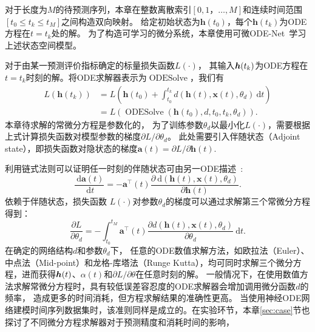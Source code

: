 对于长度为$M$的待预测序列，本章在整数离散索引$[0,1，\dots,M]$和连续时间范围$[t_0\leq t_k \leq t_{M}]$之间构造双向映射。
给定初始状态为$\boldsymbol{h}(t_0)$，每个$\boldsymbol{h}(t_k)$为ODE方程在$t=t_k$处的解。
为了构造可学习的微分系统，本章使用可微ODE-Net~\cite{NIPS2018_7892}学习上述状态空间模型。

对于由某一预测评价指标确定的标量损失函数$L(\cdot)$，
其输入$\boldsymbol{h}(t_k)$为ODE方程在$t=t_k$时刻的解。将ODE求解器表示为$\operatorname{ODESolve}$，我们有
\begin{align}
\label{equ:loss_ode_solver}
L\left(\boldsymbol{h}\left(t_{k}\right)\right)&=L\left(\boldsymbol{h}\left(t_{0}\right)+\int_{t_{0}}^{t_{k}} d(\boldsymbol{h}(t), \boldsymbol x(t), \theta_d) \mathrm{~d} t\right)\nonumber\\
&=L\left(\operatorname{ODESolve}\left(\boldsymbol{h}\left(t_{0}\right), d, t_{0}, t_{k}, \theta_d \right)\right).
\end{align}
本章待求解的常微分方程是参数化的，
为了训练参数$\theta _d$以最小化$L(\cdot)$，需要根据上式计算损失函数对模型参数的梯度$\partial L / \partial \theta _d$。
此处需要引入伴随状态（Adjoint state），即损失函数对隐状态的梯度$\boldsymbol{a}(t)=\partial L / \partial \boldsymbol{h}(t)$.

利用链式法则可以证明任一时刻的伴随状态可由另一ODE描述~\cite{NIPS2018_7892}:
\begin{equation}
\label{equ:ode_at}
\frac{\mathrm{~d} \boldsymbol{a}(t)}{\mathrm{~d} t}=-\boldsymbol{a}^{\top}(t) \frac{\partial \mathrm{~d}(\boldsymbol{h}(t), \boldsymbol x(t), \theta_d)}{\partial \boldsymbol{h}(t)}.
\end{equation}
依赖于伴随状态，损失函数 $L(\cdot)$对参数$\theta _d$的梯度可以通过求解第三个常微分方程得到：
\begin{equation}
\label{equ:grad_ode}
\frac{\partial L}{\partial \theta _d}=-\int_{t_0}^{t_{M}} \boldsymbol{a}^{\top}(t) \frac{\partial d(\boldsymbol{h}(t), \boldsymbol x(t), \theta _d)}{\partial \theta_d} \mathrm{~d} t.
\end{equation}
在确定的网络结构$d$和参数$\theta _d$下，
任意的ODE数值求解方法，如欧拉法（Euler）、中点法（Mid-point）和龙格-库塔法（Runge Kutta），均可同时求解三个微分方程，进而获得$\boldsymbol h (t)$、$\alpha (t)$和${\partial L}/{\partial \theta}$在任意时刻的解。
一般情况下，在使用数值方法求解常微分方程时，具有较低误差容忍度的ODE求解器会增加调用微分函数$d$的频率，
造成更多的时间消耗，但方程求解结果的准确性更高。
当使用神经ODE网络建模时间序列数据集时，该准则同样是成立的。在实验环节，本章\ref{sec:case}节也探讨了不同微分方程求解器对于预测精度和消耗时间的影响，

